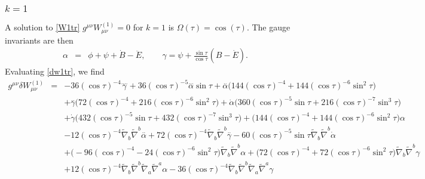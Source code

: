 \documentclass[10pt,letterpaper]{article}
\numberwithin{equation}{section}
\begin{document}
\subsubsection{$k=1$}
A solution to \eqref{W1tr} $g^{\mu\nu}W_{\mu\nu}^{(1)}=0$ for $k=1$ is $\Omega(\tau) = \cos(\tau)$. The gauge invariants are then
\begin{eqnarray}
\alpha &=& \phi + \psi + \dot B - \ddot E,\qquad \gamma = \psi + \frac{\sin\tau}{\cos\tau}(B-\dot E).
\end{eqnarray}
Evaluating \eqref{dw1tr}, we find
\begin{eqnarray}
g^{\mu\nu}\delta W_{\mu\nu}^{(1)}&=& -36 (\cos\tau)^{-4} \overset{....}{\gamma} + 36 (\cos\tau)^{-5} \overset{...}{\alpha} \sin\tau + \overset{..}{\alpha} \bigl(144 (\cos\tau)^{-4} + 144 (\cos\tau)^{-6} \sin^2\tau \bigr) \nonumber \\ 
&& + \overset{..}{\gamma} \bigl(72 (\cos\tau)^{-4} + 216 (\cos\tau)^{-6} \sin^2\tau \bigr) + \dot{\alpha} \bigl(360 (\cos\tau)^{-5} \sin\tau + 216 (\cos\tau)^{-7} \sin^3\tau \bigr) \nonumber \\ 
&& + \dot{\gamma} \bigl(432 (\cos\tau)^{-5} \sin\tau + 432 (\cos\tau)^{-7} \sin^3\tau \bigr) + \bigl(144 (\cos\tau)^{-4} + 144 (\cos\tau)^{-6} \sin^2\tau \bigr) \alpha \nonumber \\ 
&& - 12 (\cos\tau)^{-4} \tilde{\nabla}_{b}\tilde{\nabla}^{b}\overset{..}{\alpha} + 72 (\cos\tau)^{-4} \tilde{\nabla}_{b}\tilde{\nabla}^{b}\overset{..}{\gamma} - 60 (\cos\tau)^{-5} \sin\tau \tilde{\nabla}_{b}\tilde{\nabla}^{b}\dot{\alpha} \nonumber \\ 
&& + \bigl(-96 (\cos\tau)^{-4} - 24 (\cos\tau)^{-6} \sin^2\tau \bigr) \tilde{\nabla}_{b}\tilde{\nabla}^{b}\alpha + \bigl(72 (\cos\tau)^{-4} + 72 (\cos\tau)^{-6} \sin^2\tau \bigr) \tilde{\nabla}_{b}\tilde{\nabla}^{b}\gamma \nonumber \\ 
&& + 12 (\cos\tau)^{-4} \tilde{\nabla}_{b}\tilde{\nabla}^{b}\tilde{\nabla}_{a}\tilde{\nabla}^{a}\alpha - 36 (\cos\tau)^{-4} \tilde{\nabla}_{b}\tilde{\nabla}^{b}\tilde{\nabla}_{a}\tilde{\nabla}^{a}\gamma 
\end{eqnarray}
\end{document}
